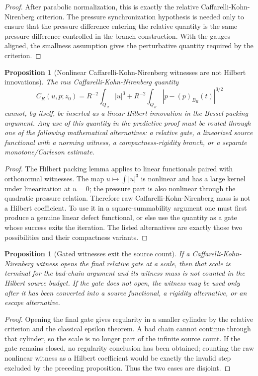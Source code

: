 \documentclass[11pt]{article}
\newtheorem{proposition}[theorem]{Proposition}
\begin{document}
\begin{proof}
After parabolic normalization, this is exactly the relative
Caffarelli-Kohn-Nirenberg criterion.  The pressure synchronization hypothesis is
needed only to ensure that the pressure difference entering the relative
quantity is the same pressure difference controlled in the branch construction.
With the gauges aligned, the smallness assumption gives the perturbative
quantity required by the criterion.
\end{proof}

\begin{proposition}[Nonlinear Caffarelli-Kohn-Nirenberg witnesses are not
Hilbert innovations]
The raw Caffarelli-Kohn-Nirenberg quantity
\[
C_R(u,p;z_0)
=R^{-2}\int_{Q_R}|u|^3
+R^{-2}\int_{Q_R}|p-(p)_{B_R}(t)|^{3/2}
\]
cannot, by itself, be inserted as a linear Hilbert innovation in the Bessel
packing argument.  Any use of this quantity in the predictive proof must be
routed through one of the following mathematical alternatives: a relative gate,
a linearized source functional with a norming witness, a compactness-rigidity
branch, or a separate monotone/Carleson estimate.
\end{proposition}

\begin{proof}
The Hilbert packing lemma applies to linear functionals paired with orthonormal
witnesses.  The map \(u\mapsto\int |u|^3\) is nonlinear and has a large kernel
under linearization at \(u=0\); the pressure part is also nonlinear through the
quadratic pressure relation.  Therefore raw Caffarelli-Kohn-Nirenberg mass is not
a Hilbert coefficient.  To use it in a square-summability argument one must first
produce a genuine linear defect functional, or else use the quantity as a gate
whose success exits the iteration.  The listed alternatives are exactly those
two possibilities and their compactness variants.
\end{proof}

\begin{proposition}[Gated witnesses exit the source count]
If a Caffarelli-Kohn-Nirenberg witness opens the final relative gate at a scale,
then that scale is terminal for the bad-chain argument and its witness mass is
not counted in the Hilbert source budget.  If the gate does not open, the witness
may be used only after it has been converted into a source functional, a rigidity
alternative, or an escape alternative.
\end{proposition}

\begin{proof}
Opening the final gate gives regularity in a smaller cylinder by the relative
criterion and the classical epsilon theorem.  A bad chain cannot continue through
that cylinder, so the scale is no longer part of the infinite source count.  If
the gate remains closed, no regularity conclusion has been obtained; counting the
raw nonlinear witness as a Hilbert coefficient would be exactly the invalid step
excluded by the preceding proposition.  Thus the two cases are disjoint.
\end{proof}
\end{document}
